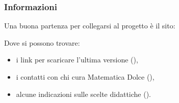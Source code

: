 \documentclass{beamer} %
\begin{document}
\begin{frame}\frametitle{Informazioni}

Una buona partenza per collegarsi al progetto è il sito:

\bigskip
\begin{center}
\href{https://www.matematicadolce.eu}
     {{\Large {}}}
\end{center}

\bigskip
Dove si possono trovare:
\begin{itemize}
\item i link per scaricare l'ultima versione 
(),
\item i contatti con chi cura Matematica Dolce
(),
\item alcune indicazioni sulle scelte didattiche
().
\end{itemize}

\end{frame}
\end{document}
